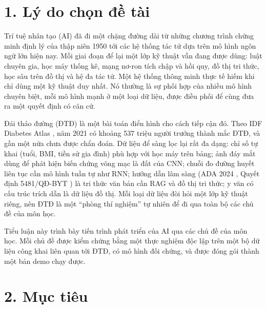 
\renewcommand{\thetable}{MĐ.\arabic{table}}\renewcommand{\thefigure}{MĐ.\arabic{figure}}

\section*{1. Lý do chọn đề tài}

Trí tuệ nhân tạo (AI) đã đi một chặng đường dài từ những chương trình chứng minh định lý của thập niên 1950 tới các hệ thống tác tử dựa trên mô hình ngôn ngữ lớn hiện nay. Mỗi giai đoạn để lại một lớp kỹ thuật vẫn đang được dùng: luật chuyên gia, học máy thống kê, mạng nơ-ron tích chập và hồi quy, đồ thị tri thức, học sâu trên đồ thị và hệ đa tác tử. Một hệ thống thông minh thực tế hiếm khi chỉ dùng một kỹ thuật duy nhất. Nó thường là sự phối hợp của nhiều mô hình chuyên biệt, mỗi mô hình mạnh ở một loại dữ liệu, được điều phối để cùng đưa ra một quyết định có căn cứ.

Đái tháo đường (ĐTĐ) là một bài toán điển hình cho cách tiếp cận đó. Theo IDF Diabetes Atlas \cite{idf2021}, năm 2021 có khoảng 537 triệu người trưởng thành mắc ĐTĐ, và gần một nửa chưa được chẩn đoán. Dữ liệu để sàng lọc lại rất đa dạng: chỉ số tự khai (tuổi, BMI, tiền sử gia đình) phù hợp với học máy trên bảng; ảnh đáy mắt dùng để phát hiện biến chứng võng mạc là đất của CNN; chuỗi đo đường huyết liên tục cần mô hình tuần tự như RNN; hướng dẫn lâm sàng (ADA 2024 \cite{ada2024}, Quyết định 5481/QĐ-BYT \cite{byt5481}) là tri thức văn bản cần RAG và đồ thị tri thức; y văn có cấu trúc trích dẫn là dữ liệu đồ thị. Mỗi loại dữ liệu đòi hỏi một lớp kỹ thuật riêng, nên ĐTĐ là một ``phòng thí nghiệm'' tự nhiên để đi qua toàn bộ các chủ đề của môn học.

Tiểu luận này trình bày tiến trình phát triển của AI qua các chủ đề của môn học. Mỗi chủ đề được kiểm chứng bằng một thực nghiệm độc lập trên một bộ dữ liệu công khai liên quan tới ĐTĐ, có mô hình đối chứng, và được đóng gói thành một bản demo chạy được.

\section*{2. Mục tiêu}

